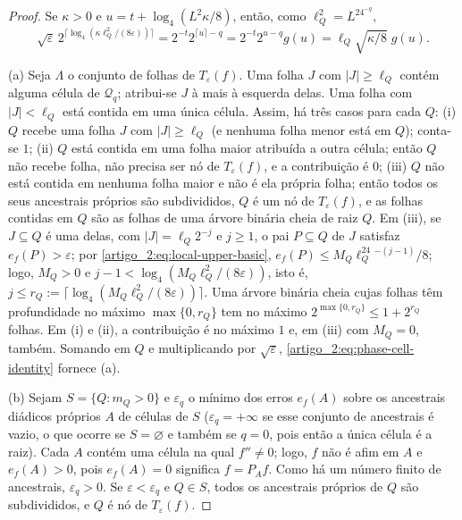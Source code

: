 \begin{proof}
Se $\kappa>0$ e $u=t+\log_4(L^2\kappa/8)$, então, como $\ell_Q^2=L^24^{-q}$,
\begin{equation}
 \sqrt\varepsilon\,2^{\lceil\log_4(\kappa\ell_Q^2/(8\varepsilon))\rceil}
 =2^{-t}2^{\lceil u\rceil-q}=2^{-t}2^{u-q}g(u)=\ell_Q\sqrt{\kappa/8}\;g(u).
 \label{artigo_2:eq:phase-cell-identity}
\end{equation}

(a) Seja $\Lambda$ o conjunto de folhas de $T_\varepsilon(f)$. Uma folha
$J$ com $|J|\ge\ell_Q$ contém alguma célula de $\mathcal Q_q$; atribui-se $J$
à mais à esquerda delas. Uma folha com $|J|<\ell_Q$ está contida em uma única
célula. Assim, há três casos para cada $Q$: (i) $Q$ recebe uma folha $J$ com
$|J|\ge\ell_Q$ (e nenhuma folha menor está em $Q$); conta-se $1$; (ii) $Q$ está
contida em uma folha maior atribuída a outra célula; então $Q$ não recebe folha,
não precisa ser nó de $T_\varepsilon(f)$, e a contribuição é $0$; (iii) $Q$ não
está contida em nenhuma folha maior e não é ela própria folha; então
todos os seus ancestrais próprios são subdivididos, $Q$ é um nó de
$T_\varepsilon(f)$, e as folhas contidas em $Q$ são as folhas
de uma árvore binária cheia de raiz $Q$. Em (iii), se $J\subseteq Q$ é uma delas, com
$|J|=\ell_Q2^{-j}$ e $j\ge1$, o pai $P\subseteq Q$ de $J$ satisfaz
$e_f(P)>\varepsilon$; por \eqref{artigo_2:eq:local-upper-basic},
$e_f(P)\le M_Q\ell_Q^24^{-(j-1)}/8$; logo, $M_Q>0$ e
$j-1<\log_4(M_Q\ell_Q^2/(8\varepsilon))$, isto é,
$j\le r_Q:=\lceil\log_4(M_Q\ell_Q^2/(8\varepsilon))\rceil$. Uma árvore binária cheia
cujas folhas têm profundidade no máximo $\max\{0,r_Q\}$ tem no máximo
$2^{\max\{0,r_Q\}}\le1+2^{r_Q}$ folhas. Em (i) e (ii), a contribuição é no máximo
$1$ e, em (iii) com $M_Q=0$, também. Somando em $Q$
e multiplicando por $\sqrt\varepsilon$,
\eqref{artigo_2:eq:phase-cell-identity} fornece (a).

(b) Sejam $S=\{Q:m_Q>0\}$ e $\varepsilon_q$ o mínimo dos erros $e_f(A)$ sobre
os ancestrais diádicos próprios $A$ de células de $S$ ($\varepsilon_q=+\infty$ se
esse conjunto de ancestrais é vazio, o que ocorre se $S=\varnothing$ e também se
$q=0$, pois então a única célula é a raiz). Cada $A$ contém uma célula na qual $f''\ne0$; logo, $f$ não é afim em $A$
e $e_f(A)>0$, pois $e_f(A)=0$ significa $f=P_Af$. Como há um número finito de
ancestrais, $\varepsilon_q>0$. Se $\varepsilon<\varepsilon_q$ e $Q\in S$, todos os
ancestrais próprios de $Q$ são subdivididos, e $Q$ é nó de $T_\varepsilon(f)$.


\end{proof}
